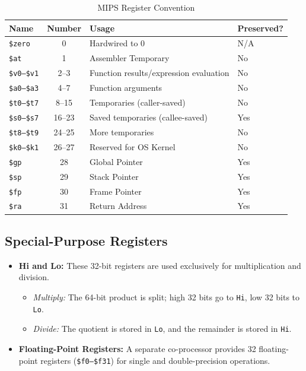 \begin{table}[h]
\centering
\begin{tabular}{lcll}
\toprule
\textbf{Name} & \textbf{Number} & \textbf{Usage} & \textbf{Preserved?} \\
\midrule
\texttt{\$zero} & 0 & Hardwired to 0 & N/A \\
\texttt{\$at} & 1 & Assembler Temporary & No \\
\texttt{\$v0--\$v1} & 2--3 & Function results/expression evaluation & No \\
\texttt{\$a0--\$a3} & 4--7 & Function arguments & No \\
\texttt{\$t0--\$t7} & 8--15 & Temporaries (caller-saved) & No \\
\texttt{\$s0--\$s7} & 16--23 & Saved temporaries (callee-saved) & Yes \\
\texttt{\$t8--\$t9} & 24--25 & More temporaries & No \\
\texttt{\$k0--\$k1} & 26--27 & Reserved for OS Kernel & No \\
\texttt{\$gp} & 28 & Global Pointer & Yes \\
\texttt{\$sp} & 29 & Stack Pointer & Yes \\
\texttt{\$fp} & 30 & Frame Pointer & Yes \\
\texttt{\$ra} & 31 & Return Address & Yes \\
\bottomrule
\end{tabular}
\caption{MIPS Register Convention}
\end{table}

\subsection{Special-Purpose Registers}

\begin{itemize}
    \item \textbf{Hi and Lo:} These 32-bit registers are used exclusively for multiplication and division.
    \begin{itemize}
        \item \textit{Multiply:} The 64-bit product is split; high 32 bits go to \texttt{Hi}, low 32 bits to \texttt{Lo}.
        \item \textit{Divide:} The quotient is stored in \texttt{Lo}, and the remainder is stored in \texttt{Hi}.
    \end{itemize}
    \item \textbf{Floating-Point Registers:} A separate co-processor provides 32 floating-point registers (\texttt{\$f0--\$f31}) for single and double-precision operations.
\end{itemize}

